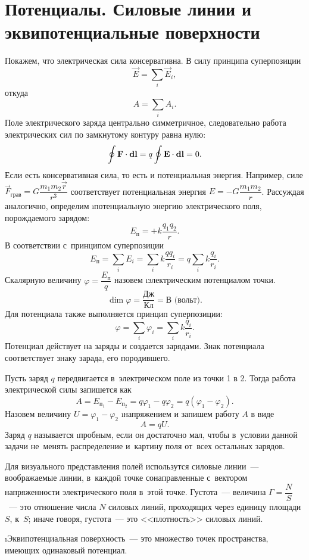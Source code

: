\section{Потенциалы. Силовые линии и эквипотенциальные поверхности}

	Покажем, что электрическая сила консервативна. В силу принципа суперпозиции
		$$\vec{E}=\sum_i \vec{E}_i,$$
	откуда
		$$A=\sum_i A_i.$$
	Поле электрического заряда центрально симметричное, следовательно работа электрических сил по замкнутому контуру равна нулю:
		$$\oint \text{\textbf{F}}\cdot\textbf{d}\text{\textbf{l}}=q\oint \text{\textbf{E}}\cdot\textbf{d}\text{\textbf{l}}=0.$$
	Если есть консервативная сила, то есть и потенциальная энергия. Например, силе $\vec{F}_{\text{грав}}=G\dfrac{m_1m_2\vec{r}}{r^3}$ соответствует потенциальная энергия $E=-G\dfrac{m_1m_2}{r}$. Рассуждая аналогично, определим \i{потенциальную энергию электрического поля, порождаемого зарядом}:
		\begin{equation}
			E_{\text{п}}=+k\frac{q_1q_2}{r}.
		\end{equation}
	В соответствии с~принципом суперпозиции
		$$E_{\text{п}}=\sum_i E_i=\sum_i k\frac{qq_i}{r_i}=q\sum_i k\frac{q_i}{r_i}.$$
	Скалярную величину $\varphi=\dfrac{E_{\text{п}}}{q}$ назовем \i{электрическим потенциалом точки}.
		$$\dim{\varphi}=\frac{\text{Дж}}{\text{Кл}}=\text{В (вольт)}.$$
	Для потенциала также выполняется принцип суперпозиции:
		$$\varphi=\sum_i \varphi_i=\sum_i k\frac{q_i}{r_i}.$$
	Потенциал действует на заряды и создается зарядами. Знак потенциала соответствует знаку зарада, его породившего. \par
	Пусть заряд $q$ передвигается в~электрическом поле из точки 1 в 2. Тогда работа электрической силы запишется как
		$$A=E_{\text{п}_{\text{1}}}-E_{\text{п}_{\text{2}}}=q\varphi_1-q\varphi_2=q(\varphi_1-\varphi_2).$$
	Назовем величину $U=\varphi_1-\varphi_2$ \i{напряжением} и запишем работу $A$ в виде
		\begin{equation}
			A=qU.
		\end{equation}
	Заряд $q$ называется \i{пробным}, если он достаточно мал, чтобы в~условии данной задачи не~менять распределение и~картину поля от~всех остальных зарядов.\par
	Для визуального представления полей использутся силовые линии~--- воображаемые линии, в~каждой точке сонаправленные с~вектором напряженности электрического поля в~этой точке. Густота~--- величина $\Gamma=\dfrac{N}{S}$~--- это отношение числа $N$ силовых линий, проходящих через единицу площади $S$, к~$S$; иначе говоря, густота~--- это <<плотность>> силовых линий.\par
	\i{Эквипотенциальная поверхность}~--- это множество точек пространства, имеющих одинаковый потенциал.
	
